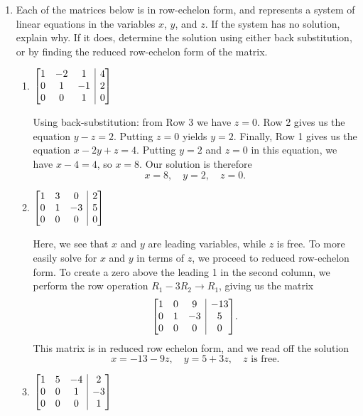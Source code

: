\documentclass[12pt]{article}
\makeatletter
\newcommand{\points}[1]{\marginpar{\hspace{24pt}[#1]}}
\newenvironment{amatrix}[1]{%
  \left[\begin{array}{@{}*{#1}{c}|c@{}}
}{%
  \end{array}\right]
}
\makeatother
\begin{document}
\begin{enumerate}
\begin{enumerate}
\end{enumerate}
\newpage

\item Each of the matrices below is in row-echelon form, and represents a system of linear equations in the variables $x$, $y$, and $z$. If the system has no solution, explain why. If it does, determine the solution using either back substitution, or by finding the reduced row-echelon form of the matrix.\points{9}
\begin{enumerate}
 \item $\begin{amatrix}{3}1&-2&1&4\\0&1&-1&2\\0&0&1&0\end{amatrix}$ 

\bigskip

Using back-substitution: from Row 3 we have $z=0$. Row 2 gives us the equation $y-z=2$. Putting $z=0$ yields $y=2$. Finally, Row 1 gives us the equation $x-2y+z=4$. Putting $y=2$ and $z=0$ in this equation, we have $x-4=4$, so $x=8$. Our solution is therefore
\[
 x=8, \quad y=2, \quad z=0.
\]

\bigskip

 \item $\begin{amatrix}{3}1&3&0&2\\0&1&-3&5\\0&0&0&0\end{amatrix}$ 

\bigskip

Here, we see that $x$ and $y$ are leading variables, while $z$ is free. To more easily solve for $x$ and $y$ in terms of $z$, we proceed to reduced row-echelon form. To create a zero above the leading 1 in the second column, we perform the row operation $R_1-3R_2\to R_1$, giving us the matrix
\[
 \begin{amatrix}{3}
  1&0&9&-13\\0&1&-3&5\\0&0&0&0
 \end{amatrix}.
\]
This matrix is in reduced row echelon form, and we read off the solution
\[
 x = -13 - 9z, \quad y = 5 + 3z, \quad z \text{ is free.}
\]

\bigskip

 \item $\begin{amatrix}{3}1&5&-4&2\\0&0&1&-3\\0&0&0&1\end{amatrix}$ 


\end{enumerate}
\end{enumerate}
\end{document}

